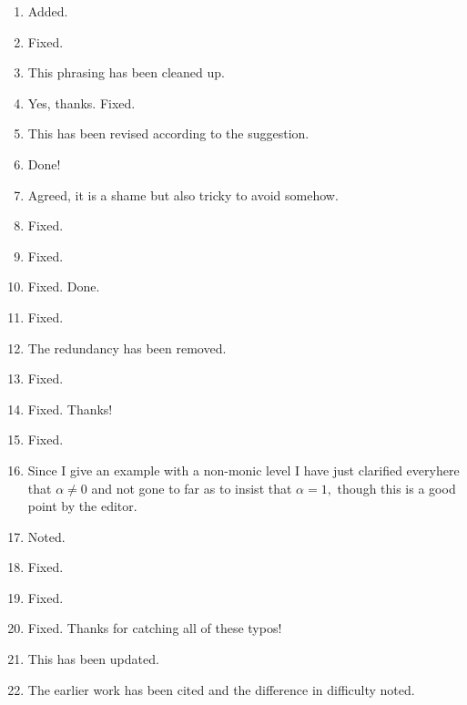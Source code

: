 \documentclass[12pt]{article}
\begin{document}
\begin{enumerate}
		\item Added.
		
		\item Fixed.
		
		\item This phrasing has been cleaned up.
		
		\item Yes, thanks. Fixed.
		
		\item This has been revised according to the suggestion.
		
		\item Done!
		
		\item Agreed, it is a shame but also tricky to avoid somehow.
		
		\item Fixed.
		
		\item Fixed.
		
		\item Fixed. Done.
		
		\item Fixed.
		
		\item The redundancy has been removed.
		
		\item Fixed.
		
		\item Fixed. Thanks!
		
		\item Fixed. 
		
		\item Since I give an example with a non-monic level I have just clarified everyhere that $\alpha\neq 0$ and not gone to far as to insist that $\alpha=1,$ though this is a good point by the editor.
		
		\item Noted.
		
		\item Fixed.
		
		\item Fixed.
		
		\item Fixed. Thanks for catching all of these typos!
		
		\item This has been updated.
		
		\item The earlier work has been cited and the difference in difficulty noted.
		

\end{enumerate}
\end{document}
